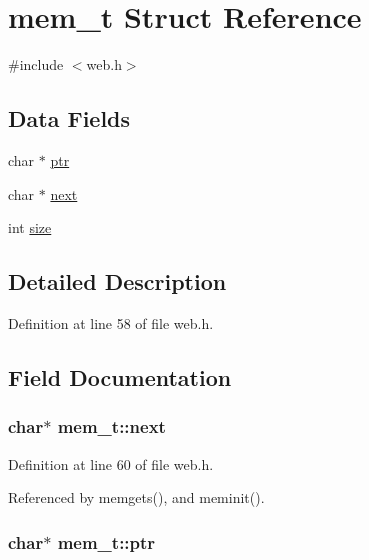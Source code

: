 \hypertarget{structmem__t}{}\section{mem\+\_\+t Struct Reference}
\label{structmem__t}


{\ttfamily \#include $<$web.\+h$>$}

\subsection*{Data Fields}
\begin{DoxyCompactItemize}
\item 
char $\ast$ \hyperlink{structmem__t_af9fd184846ee12236e952731fa592a74}{ptr}
\item 
char $\ast$ \hyperlink{structmem__t_a57b0ca2400c977d234c77e9d20a03c46}{next}
\item 
int \hyperlink{structmem__t_ab04d46fb2982c9a26a26244286c1b33b}{size}
\end{DoxyCompactItemize}


\subsection{Detailed Description}


Definition at line 58 of file web.\+h.



\subsection{Field Documentation}
\subsubsection[{\texorpdfstring{next}{next}}]{\setlength{\rightskip}{0pt plus 5cm}char$\ast$ mem\+\_\+t\+::next}\hypertarget{structmem__t_a57b0ca2400c977d234c77e9d20a03c46}{}\label{structmem__t_a57b0ca2400c977d234c77e9d20a03c46}


Definition at line 60 of file web.\+h.



Referenced by memgets(), and meminit().

\subsubsection[{\texorpdfstring{ptr}{ptr}}]{\setlength{\rightskip}{0pt plus 5cm}char$\ast$ mem\+\_\+t\+::ptr}\hypertarget{structmem__t_af9fd184846ee12236e952731fa592a74}{}\label{structmem__t_af9fd184846ee12236e952731fa592a74}


